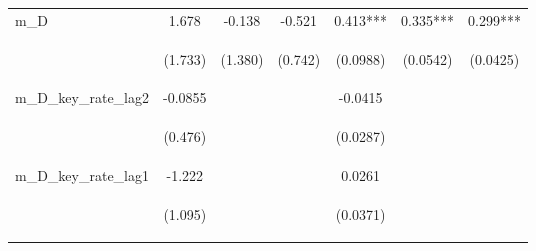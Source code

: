 \documentclass[]{article}
\begin{document}
\begin{center}
\begin{tabular}{lcccccc}
m\_D & 1.678 & -0.138 & -0.521 & 0.413*** & 0.335*** & 0.299*** \\
\vspace{4pt} & \begin{footnotesize}(1.733)\end{footnotesize} & \begin{footnotesize}(1.380)\end{footnotesize} & \begin{footnotesize}(0.742)\end{footnotesize} & \begin{footnotesize}(0.0988)\end{footnotesize} & \begin{footnotesize}(0.0542)\end{footnotesize} & \begin{footnotesize}(0.0425)\end{footnotesize} \\
m\_D\_key\_rate\_lag2 & -0.0855 &  &  & -0.0415 &  &  \\
\vspace{4pt} & \begin{footnotesize}(0.476)\end{footnotesize} & \begin{footnotesize}\end{footnotesize} & \begin{footnotesize}\end{footnotesize} & \begin{footnotesize}(0.0287)\end{footnotesize} & \begin{footnotesize}\end{footnotesize} & \begin{footnotesize}\end{footnotesize} \\
m\_D\_key\_rate\_lag1 & -1.222 &  &  & 0.0261 &  &  \\
\vspace{4pt} & \begin{footnotesize}(1.095)\end{footnotesize} & \begin{footnotesize}\end{footnotesize} & \begin{footnotesize}\end{footnotesize} & \begin{footnotesize}(0.0371)\end{footnotesize} & \begin{footnotesize}\end{footnotesize} & \begin{footnotesize}\end{footnotesize} \\

\end{tabular}
\end{center}
\end{document}
